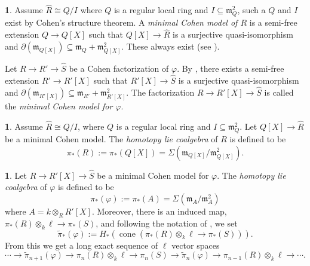 \documentclass{amsart}
\theoremstyle{definition}
\newtheorem{chunk}[theorem]{}
\newcommand{\m}{\mathfrak{m}}
\newcommand{\cone}[1]{\operatorname{cone}(#1)}
\newcommand{\wpi}{\widetilde{\pi}}
\begin{document}
\begin{chunk}
    Assume $\widehat R \cong Q /I$ where $Q$ is a regular local ring and $I \subseteq \m_Q^2$, such a $Q$ and $I$ exist by Cohen's structure theorem. A \textit{minimal Cohen model of $R$} is a semi-free extension $Q \to Q[X]$ such that $Q[X] \to \widehat R$ is a surjective quasi-isomorphism and $\partial(\m_{Q[X]}) \subseteq \m_Q+\m_{Q[X]}^2$. These always exist (see \cite[Section 7.2]{Avramov:2010}).

    Let $R \to R' \to \widehat S$ be a Cohen factorization of $\varphi$. By \cite[Section 7.2]{Avramov:2010}, there exists a semi-free extension $R' \to R'[X]$ such that $R'[X] \to \widehat S$ is a surjective quasi-isomorphism and $\partial(\m_{R'[X]}) \subseteq \m_{R'}+\m_{R'[X]}^2$. The factorization $R \to R'[X] \to \widehat S$ is called the \textit{minimal Cohen model for $\varphi$}.
\end{chunk}


\begin{chunk}\label{C_hlca_def}
    Assume $\widehat R \cong Q/I$, where $Q$ is a regular local ring and $I \subseteq \m_Q^2$. Let $Q[X] \to \widehat R$ be a minimal Cohen model. The \textit{homotopy lie coalgebra} of $R$ is defined to be
    \[
         \pi_*(R) := \pi_*(Q[X]) =\Sigma (\m_{Q[X]}/\m^2_{Q[X]}).
    \]
\end{chunk}


\begin{chunk} \label{C_LESwithPi}
    Let $R \to R'[X] \rightarrow \widehat S$ be a minimal Cohen model for $\varphi$. The \textit{homotopy lie coalgebra} of $\varphi$ is defined to be
    \[
        \pi_*(\varphi) := \pi_*(A) = \Sigma(\m_A/\m_A^2)
    \]
    where  $A = k \otimes _R R'[X]$. Moreover, there is an induced map, $\pi_*(R) \otimes_k \ell \to \pi_*(S)$, and following the notation of \cite{Briggs:2018}, we set
    \[
         \wpi_*(\varphi) := H_*\left(\cone{\pi_*(R) \otimes_k \ell \to \pi_*(S)}\right).
    \]
     From this we get a long exact sequence of $\ell$ vector spaces \cite[(3.4)]{Briggs:2018}
     \[
        \cdots \to  \wpi_{n+1}(\varphi) \to \pi_n(R)\otimes_k \ell \to \pi_n(S) \to  \wpi_n(\varphi) \to \pi_{n-1}(R)\otimes_k \ell \to \cdots.
     \]
\end{chunk}
\end{document}
